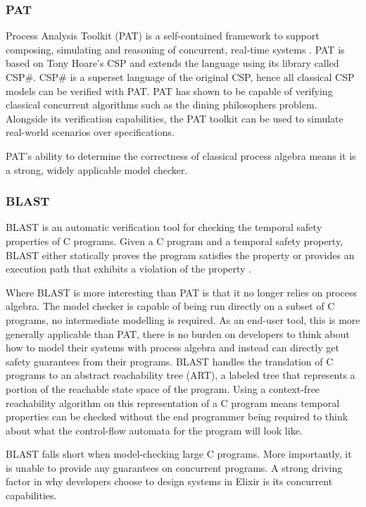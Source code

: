 \subsubsection*{\textbf{PAT}}
Process Analysis Toolkit (PAT) is a self-contained framework to support composing, simulating and reasoning of concurrent, real-time systems \cite{pat}. PAT is based on Tony Hoare's CSP and extends the language using its library called CSP\#. CSP\# is a superset language of the original CSP, hence all classical CSP models can be verified with PAT. PAT has shown to be capable of verifying classical concurrent algorithms such as the dining philosophers problem. Alongside its verification capabilities, the PAT toolkit can be used to simulate real-world scenarios over specifications. 
\par
PAT's ability to determine the correctness of classical process algebra means it is a strong, widely applicable model checker.

\subsubsection*{\textbf{BLAST}}
BLAST is an automatic verification tool for checking the temporal safety properties of C programs. Given a C program and a temporal safety property, BLAST either statically proves the program satisfies the property or provides an execution path that exhibits a violation of the property \cite{blast}.
\par
Where BLAST is more interesting than PAT is that it no longer relies on process algebra. The model checker is capable of being run directly on a subset of C programs, no intermediate modelling is required. As an end-user tool, this is more generally applicable than PAT, there is no burden on developers to think about how to model their systems with process algebra and instead can directly get safety guarantees from their programs. BLAST handles the translation of C programs to an abstract reachability tree (ART), a labeled tree that represents a portion of the reachable state space of the program. Using a context-free reachability algorithm on this representation of a C program means temporal properties can be checked without the end programmer being required to think about what the control-flow automata for the program will look like.
\par
BLAST falls short when model-checking large C programs. More importantly, it is unable to provide any guarantees on concurrent programs. A strong driving factor in why developers choose to design systems in Elixir is its concurrent capabilities. 

